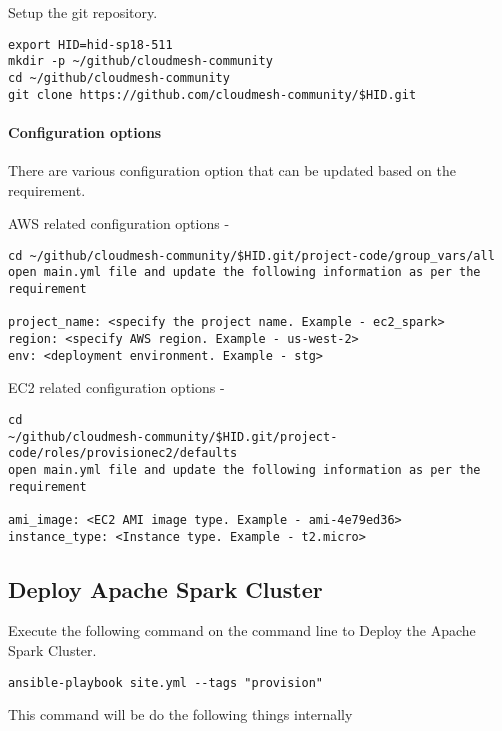 Setup the git repository.

\begin{verbatim}
export HID=hid-sp18-511
mkdir -p ~/github/cloudmesh-community
cd ~/github/cloudmesh-community
git clone https://github.com/cloudmesh-community/$HID.git
\end{verbatim}


\paragraph{Configuration options}

There are various configuration option that can be updated based on the requirement.

AWS related configuration options -

\begin{verbatim}
cd ~/github/cloudmesh-community/$HID.git/project-code/group_vars/all
open main.yml file and update the following information as per the requirement

project_name: <specify the project name. Example - ec2_spark>
region: <specify AWS region. Example - us-west-2>
env: <deployment environment. Example - stg>
\end{verbatim}

EC2 related configuration options -

\begin{verbatim}
cd
~/github/cloudmesh-community/$HID.git/project-code/roles/provisionec2/defaults
open main.yml file and update the following information as per the requirement
 
ami_image: <EC2 AMI image type. Example - ami-4e79ed36>
instance_type: <Instance type. Example - t2.micro>
\end{verbatim}

\subsection{Deploy Apache Spark Cluster}

Execute the following command on the command line to Deploy the Apache Spark Cluster.

\begin{verbatim}
ansible-playbook site.yml --tags "provision"
\end{verbatim}

This command will be do the following things internally 


